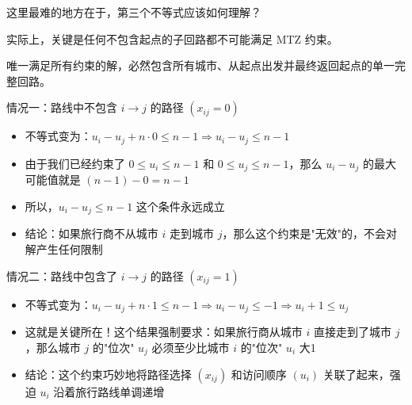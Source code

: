 \begin{tips}
    这里最难的地方在于，第三个不等式应该如何理解？

    实际上，关键是任何不包含起点的子回路都不可能满足 MTZ 约束。

    唯一满足所有约束的解，必然包含所有城市、从起点出发并最终返回起点的单一完整回路。
\end{tips}

\begin{solution}
    情况一：路线中不包含 $i \rightarrow j$ 的路径 $\left(x_{i j}=0\right)$
    \begin{itemize}
        \item 不等式变为：$u_i-u_j+n \cdot 0 \leq n-1 \Longrightarrow u_i-u_j \leq n-1$
        \item 由于我们已经约束了 $0 \leq u_i \leq n-1$ 和 $0 \leq u_j \leq n-1$，那么 $u_i-u_j$ 的最大可能值就是 $(n-1)-0=n-1$
        \item 所以，$u_i-u_j \leq n-1$ 这个条件永远成立
        \item 结论：如果旅行商不从城市 $i$ 走到城市 $j$，那么这个约束是"无效"的，不会对解产生任何限制
    \end{itemize}

    情况二：路线中包含了 $i \rightarrow j$ 的路径 $\left(x_{i j}=1\right)$
    \begin{itemize}
        \item 不等式变为：$u_i-u_j+n \cdot 1 \leq n-1 \Longrightarrow u_i-u_j \leq-1 \Longrightarrow u_i+1 \leq u_j$
        \item 这就是关键所在！这个结果强制要求：如果旅行商从城市 $i$ 直接走到了城市 $j$，那么城市 $j$ 的"位次" $u_j$ 必须至少比城市 $i$ 的"位次" $u_i$ 大1
        \item 结论：这个约束巧妙地将路径选择 $\left(x_{i j}\right)$ 和访问顺序 $\left(u_i\right)$ 关联了起来，强迫 $u_i$ 沿着旅行路线单调递增
    \end{itemize}
\end{solution}

